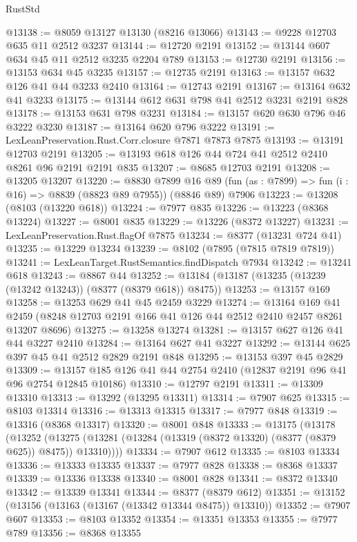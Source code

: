 \begin{lexlean}{RustStd}
\begin{coremodule}
@13138 := @8059 @13127 @13130 (@8216 @13066)
@13143 := @9228 @12703 @635 @11 @2512 @3237
@13144 := @12720 @2191
@13152 := @13144 @607 @634 @45 @11 @2512 @3235 @2204 @789
@13153 := @12730 @2191
@13156 := @13153 @634 @45 @3235
@13157 := @12735 @2191
@13163 := @13157 @632 @126 @41 @44 @3233 @2410
@13164 := @12743 @2191
@13167 := @13164 @632 @41 @3233
@13175 := @13144 @612 @631 @798 @41 @2512 @3231 @2191 @828
@13178 := @13153 @631 @798 @3231
@13184 := @13157 @620 @630 @796 @46 @3222 @3230
@13187 := @13164 @620 @796 @3222
@13191 := LexLeanPreservation.Rust.Corr.closure @7871 @7873 @7875
@13193 := @13191 @12703 @2191
@13205 := @13193 @618 @126 @44 @724 @41 @2512 @2410 @8261 @96 @2191 @2191 @835
@13207 := @8685 @12703 @2191
@13208 := @13205 @13207
@13220 := @8830
    @7899
    @16
    @89
    (fun (as : @7899) => fun (i : @16) => @8839 (@8823 @89 @7955))
    (@8846 @89)
    @7906
@13223 := @13208 (@8103 (@13220 @618))
@13224 := @7977 @835
@13226 := @13223 (@8368 @13224)
@13227 := @8001 @835
@13229 := @13226 (@8372 @13227)
@13231 := LexLeanPreservation.Rust.flagOf @7875
@13234 := @8377 (@13231 @724 @41)
@13235 := @13229 @13234
@13239 := @8102 (@7895 (@7815 @7819 @7819))
@13241 := LexLeanTarget.RustSemantics.findDispatch @7934
@13242 := @13241 @618
@13243 := @8867 @44
@13252 := @13184 (@13187 (@13235 (@13239 (@13242 @13243)) (@8377 (@8379 @618)) @8475))
@13253 := @13157 @169
@13258 := @13253 @629 @41 @45 @2459 @3229
@13274 := @13164
    @169
    @41
    @2459
    (@8248 @12703 @2191 @166 @41 @126 @44 @2512 @2410 @2457 @8261 @13207 @8696)
@13275 := @13258 @13274
@13281 := @13157 @627 @126 @41 @44 @3227 @2410
@13284 := @13164 @627 @41 @3227
@13292 := @13144 @625 @397 @45 @41 @2512 @2829 @2191 @848
@13295 := @13153 @397 @45 @2829
@13309 := @13157 @185 @126 @41 @44 @2754 @2410 (@12837 @2191 @96 @41 @96 @2754 @12845 @10186)
@13310 := @12797 @2191
@13311 := @13309 @13310
@13313 := @13292 (@13295 @13311)
@13314 := @7907 @625
@13315 := @8103 @13314
@13316 := @13313 @13315
@13317 := @7977 @848
@13319 := @13316 (@8368 @13317)
@13320 := @8001 @848
@13333 := @13175
    (@13178
      (@13252 (@13275 (@13281 (@13284 (@13319 (@8372 @13320) (@8377 (@8379 @625)) @8475)) @13310))))
@13334 := @7907 @612
@13335 := @8103 @13334
@13336 := @13333 @13335
@13337 := @7977 @828
@13338 := @8368 @13337
@13339 := @13336 @13338
@13340 := @8001 @828
@13341 := @8372 @13340
@13342 := @13339 @13341
@13344 := @8377 (@8379 @612)
@13351 := @13152 (@13156 (@13163 (@13167 (@13342 @13344 @8475)) @13310))
@13352 := @7907 @607
@13353 := @8103 @13352
@13354 := @13351 @13353
@13355 := @7977 @789
@13356 := @8368 @13355

\end{coremodule}
\end{lexlean}
